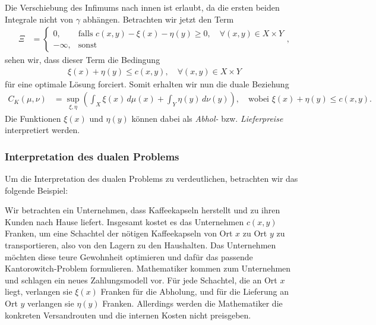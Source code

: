 Die Verschiebung des Infimums nach innen ist erlaubt,
da die ersten beiden Integrale nicht von $\gamma$ abhängen.
Betrachten wir jetzt den Term
\begin{align*}
\Xi
&=
\begin{cases}
0,
& \text{falls } c(x,y) - \xi(x) - \eta(y) \geq 0
,\quad\forall (x,y) \in X \times Y
\\
-\infty,
& \text{sonst}
\end{cases}
,
\end{align*}
sehen wir,
dass dieser Term die Bedingung
\begin{align*}
\xi(x) + \eta(y) \leq c(x,y)
,\quad
\forall (x,y) \in X \times Y
\end{align*}
für eine optimale Lösung forciert.
Somit erhalten wir nun die duale Beziehung
\begin{align*}
C_K(\mu, \nu)
&=
\sup_{\xi, \eta}
\left(
\int_X \xi(x)\, d\mu(x)
+ \int_Y \eta(y)\, d\nu(y)
\right)
,\quad\text{wobei }
\xi(x) + \eta(y) \leq c(x,y)
.
\end{align*}
Die Funktionen $\xi(x)$ und $\eta(y)$ können dabei als
\emph{Abhol-} bzw. \emph{Lieferpreise} interpretiert werden.

\subsubsection{Interpretation des dualen Problems}
Um die Interpretation des dualen Problems zu verdeutlichen,
betrachten wir das folgende Beispiel:

Wir betrachten ein Unternehmen,
dass Kaffeekapseln herstellt und zu ihren Kunden nach Hause liefert.
Insgesamt kostet es das Unternehmen $c(x,y)$ Franken,
um eine Schachtel der nötigen Kaffeekapseln von Ort $x$ zu Ort $y$ zu transportieren,
also von den Lagern zu den Haushalten.
Das Unternehmen möchten diese teure Gewohnheit optimieren und
dafür das passende Kantorowitch-Problem formulieren.
Mathematiker kommen zum Unternehmen und schlagen ein neues Zahlungsmodell vor.
Für jede Schachtel,
die an Ort $x$ liegt,
verlangen sie $\xi(x)$ Franken für die Abholung,
und für die Lieferung an Ort $y$ verlangen sie $\eta(y)$ Franken.
Allerdings werden die Mathematiker die konkreten Versandrouten und 
die internen Kosten nicht preisgeben.

